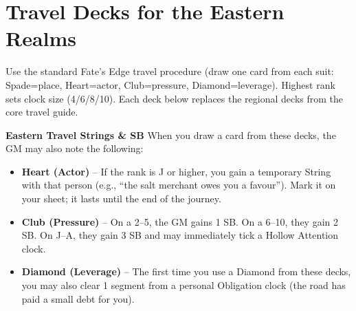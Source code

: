 \documentclass[12pt]{book}
\begin{document}
\chapter{Travel Decks for the Eastern Realms}

Use the standard Fate's Edge travel procedure (draw one card from each suit: Spade=place, Heart=actor, Club=pressure, Diamond=leverage). Highest rank sets clock size (4/6/8/10). Each deck below replaces the regional decks from the core travel guide.

\begin{infobox}
\textbf{Eastern Travel Strings \& SB}
When you draw a card from these decks, the GM may also note the following:
\begin{itemize}
    \item \textbf{Heart (Actor)} – If the rank is J or higher, you gain a temporary String with that person (e.g., “the salt merchant owes you a favour”). Mark it on your sheet; it lasts until the end of the journey.
    \item \textbf{Club (Pressure)} – On a 2–5, the GM gains 1 SB. On a 6–10, they gain 2 SB. On J–A, they gain 3 SB and may immediately tick a Hollow Attention clock.
    \item \textbf{Diamond (Leverage)} – The first time you use a Diamond from these decks, you may also clear 1 segment from a personal Obligation clock (the road has paid a small debt for you).
\end{itemize}
\end{infobox}
\end{document}
